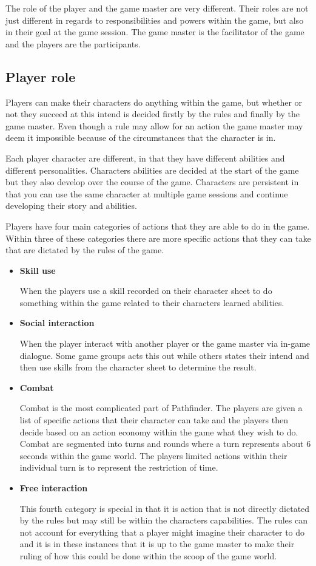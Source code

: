 The role of the player and the game master are very different. Their roles are not just different in regards to responsibilities and powers within the game, but also in their goal at the game session. The game master is the facilitator of the game and the players are the participants. 

\subsection*{Player role}
Players can make their characters do anything within the game, but whether or not they succeed at this intend is decided firstly by the rules and finally by the game master. Even though a rule may allow for an action the game master may deem it impossible because of the circumstances that the character is in.

Each player character are different, in that they have different abilities and different personalities. Characters abilities are decided at the start of the game but they also develop over the course of the game. Characters are persistent in that you can use the same character at multiple game sessions and continue developing their story and abilities.

Players have four main categories of actions that they are able to do in the game. Within three of these categories there are more specific actions that they can take that are dictated by the rules of the game. 
\begin{itemize}
\item \textbf{Skill use}

When the players use a skill recorded on their character sheet to do something within the game related to their characters learned abilities.

\item \textbf{Social interaction}

When the player interact with another player or the game master via in-game dialogue. Some game groups acts this out while others states their intend and then use skills from the character sheet to determine the result.

\item \textbf{Combat}

Combat is the most complicated part of Pathfinder. The players are given a list of specific actions that their character can take and the players then decide based on an action economy within the game what they wish to do. Combat are segmented into turns and rounds where a turn represents about 6 seconds within the game world. The players limited actions within their individual turn is to represent the restriction of time.

\item \textbf{Free interaction}

This fourth category is special in that it is action that is not directly dictated by the rules but may still be within the characters capabilities. The rules can not account for everything that a player might imagine their character to do and it is in these instances that it is up to the game master to make their ruling of how this could be done within the scoop of the game world.
\end{itemize}


